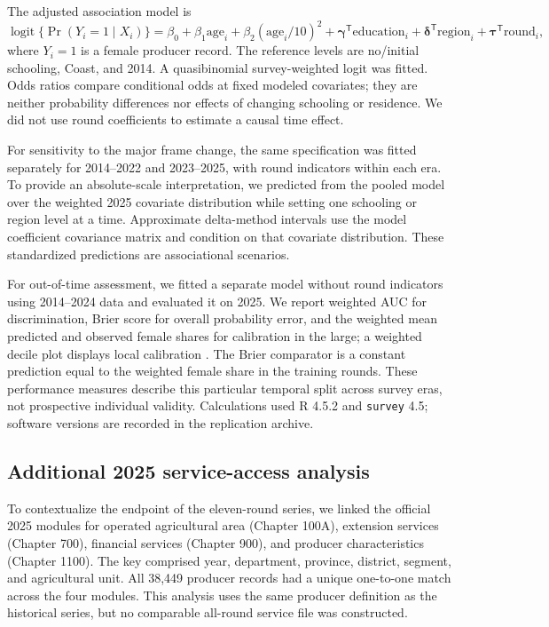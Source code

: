 \documentclass[11pt,a4paper]{article}
\begin{document}
The adjusted association model is
\begin{equation}\label{eq:logit}
\operatorname{logit}\{\Pr(Y_i=1\mid X_i)\}
=\beta_0+\beta_1\mathrm{age}_i+\beta_2(\mathrm{age}_i/10)^2
+\boldsymbol\gamma^{\mathsf T}\mathrm{education}_i
+\boldsymbol\delta^{\mathsf T}\mathrm{region}_i
+\boldsymbol\tau^{\mathsf T}\mathrm{round}_i,
\end{equation}
where $Y_i=1$ is a female producer record. The reference levels are no/initial schooling, Coast, and 2014. A quasibinomial survey-weighted logit was fitted. Odds ratios compare conditional odds at fixed modeled covariates; they are neither probability differences nor effects of changing schooling or residence. We did not use round coefficients to estimate a causal time effect.

For sensitivity to the major frame change, the same specification was fitted separately for 2014--2022 and 2023--2025, with round indicators within each era. To provide an absolute-scale interpretation, we predicted from the pooled model over the weighted 2025 covariate distribution while setting one schooling or region level at a time. Approximate delta-method intervals use the model coefficient covariance matrix and condition on that covariate distribution. These standardized predictions are associational scenarios.

For out-of-time assessment, we fitted a separate model without round indicators using 2014--2024 data and evaluated it on 2025. We report weighted AUC for discrimination, Brier score for overall probability error, and the weighted mean predicted and observed female shares for calibration in the large; a weighted decile plot displays local calibration \cite{steyerberg2010}. The Brier comparator is a constant prediction equal to the weighted female share in the training rounds. These performance measures describe this particular temporal split across survey eras, not prospective individual validity. Calculations used R 4.5.2 and \texttt{survey} 4.5; software versions are recorded in the replication archive.

\subsection{Additional 2025 service-access analysis}
To contextualize the endpoint of the eleven-round series, we linked the official 2025 modules for operated agricultural area (Chapter 100A), extension services (Chapter 700), financial services (Chapter 900), and producer characteristics (Chapter 1100). The key comprised year, department, province, district, segment, and agricultural unit. All 38,449 producer records had a unique one-to-one match across the four modules. This analysis uses the same producer definition as the historical series, but no comparable all-round service file was constructed.
\end{document}
